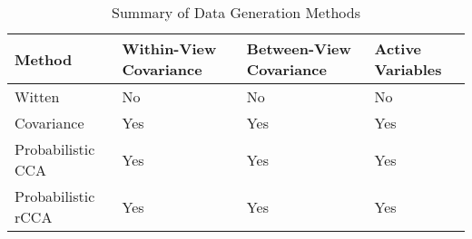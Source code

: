 \begin{table}[h]
    \centering
    \caption{Summary of Data Generation Methods}
    \begin{tabular}{l|l|l|l}
        \textbf{Method} & \textbf{Within-View Covariance} & \textbf{Between-View Covariance} & \textbf{Active
        Variables} \\
        \hline
        Witten           & No                              & No                               & No                        \\
        Covariance       & Yes                             & Yes                              & Yes                       \\
        Probabilistic CCA & Yes                             & Yes                              & Yes                       \\
        Probabilistic rCCA & Yes                             & Yes                              & Yes                       \\
    \end{tabular}
    \label{table:data-generation-methods-properties}
\end{table}


